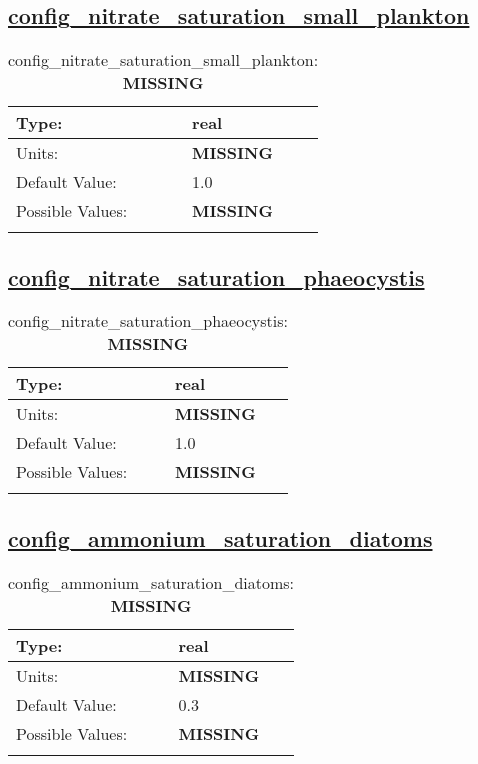 \subsection[config\_nitrate\_saturation\_small\_plankton]{\hyperref[sec:nm_tab_biogeochemistry]{config\_nitrate\_saturation\_small\_plankton}}
\label{subsec:nm_sec_config_nitrate_saturation_small_plankton}
\begin{center}
\begin{longtable}{| p{2.0in} || p{4.0in} |}
    \hline
    Type: & real \\
    \hline
    Units: & {\bf \color{red} MISSING} \\
    \hline
    Default Value: & 1.0 \\
    \hline
    Possible Values: & {\bf \color{red} MISSING} \\
    \hline
    \caption{config\_nitrate\_saturation\_small\_plankton: {\bf \color{red} MISSING}}
\end{longtable}
\end{center}
\subsection[config\_nitrate\_saturation\_phaeocystis]{\hyperref[sec:nm_tab_biogeochemistry]{config\_nitrate\_saturation\_phaeocystis}}
\label{subsec:nm_sec_config_nitrate_saturation_phaeocystis}
\begin{center}
\begin{longtable}{| p{2.0in} || p{4.0in} |}
    \hline
    Type: & real \\
    \hline
    Units: & {\bf \color{red} MISSING} \\
    \hline
    Default Value: & 1.0 \\
    \hline
    Possible Values: & {\bf \color{red} MISSING} \\
    \hline
    \caption{config\_nitrate\_saturation\_phaeocystis: {\bf \color{red} MISSING}}
\end{longtable}
\end{center}
\subsection[config\_ammonium\_saturation\_diatoms]{\hyperref[sec:nm_tab_biogeochemistry]{config\_ammonium\_saturation\_diatoms}}
\label{subsec:nm_sec_config_ammonium_saturation_diatoms}
\begin{center}
\begin{longtable}{| p{2.0in} || p{4.0in} |}
    \hline
    Type: & real \\
    \hline
    Units: & {\bf \color{red} MISSING} \\
    \hline
    Default Value: & 0.3 \\
    \hline
    Possible Values: & {\bf \color{red} MISSING} \\
    \hline
    \caption{config\_ammonium\_saturation\_diatoms: {\bf \color{red} MISSING}}
\end{longtable}
\end{center}
